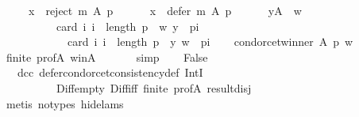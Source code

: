 \begin{isabellebody}
\ \ \ \ {}{\isacharcolon}{\kern0pt}\ {\isachardoublequoteopen}x\ {\isasymin}\ reject\ m\ A\ p{\isachardoublequoteclose}\ \isanewline
\ \ \ \ {}{\isacharcolon}{\kern0pt}\ {\isachardoublequoteopen}x\ {\isasymin}\ defer\ m\ A\ p{\isachardoublequoteclose}\ \isanewline
\ \ \ \ {}{\isacharcolon}{\kern0pt}\ {\isachardoublequoteopen}{\isasymforall}y{\isasymin}A\ {\isacharminus}{\kern0pt}\ {\isacharbraceleft}{\kern0pt}w{\isacharbraceright}{\kern0pt}{\isachardot}{\kern0pt}\isanewline
\ \ \ \ \ \ \ \ \ \ card\ {\isacharbraceleft}{\kern0pt}i{\isachardot}{\kern0pt}\ i\ {\isacharless}{\kern0pt}\ length\ p\ {\isasymand}\ {\isacharparenleft}{\kern0pt}w{\isacharcomma}{\kern0pt}\ y{\isacharparenright}{\kern0pt}\ {\isasymin}\ {\isacharparenleft}{\kern0pt}p{\isacharbang}{\kern0pt}i{\isacharparenright}{\kern0pt}{\isacharbraceright}{\kern0pt}\ {\isacharless}{\kern0pt}\isanewline
\ \ \ \ \ \ \ \ \ \ \ \ card\ {\isacharbraceleft}{\kern0pt}i{\isachardot}{\kern0pt}\ i\ {\isacharless}{\kern0pt}\ length\ p\ {\isasymand}\ {\isacharparenleft}{\kern0pt}y{\isacharcomma}{\kern0pt}\ w{\isacharparenright}{\kern0pt}\ {\isasymin}\ {\isacharparenleft}{\kern0pt}p{\isacharbang}{\kern0pt}i{\isacharparenright}{\kern0pt}{\isacharbraceright}{\kern0pt}{\isachardoublequoteclose}\isanewline
\ \ \isamarkupfalse%
\ {\isachardoublequoteopen}condorcet{\isacharunderscore}{\kern0pt}winner\ A\ p\ w{\isachardoublequoteclose}\isanewline
\ \ \ \ \isamarkupfalse%
\ finite\ prof{\isacharunderscore}{\kern0pt}A\ w{\isacharunderscore}{\kern0pt}in{\isacharunderscore}{\kern0pt}A\ {\isachardoublequoteopen}{}{\isachardoublequoteclose}\isanewline
\ \ \ \ \isamarkupfalse%
\ simp\isanewline
\ \ \isamarkupfalse%
\ {\isachardoublequoteopen}False{\isachardoublequoteclose}\isanewline
\ \ \ \ \isamarkupfalse%
\ {\isachardoublequoteopen}{}{\isachardoublequoteclose}\ {\isachardoublequoteopen}{}{\isachardoublequoteclose}\ dcc\ defer{\isacharunderscore}{\kern0pt}condorcet{\isacharunderscore}{\kern0pt}consistency{\isacharunderscore}{\kern0pt}def\ IntI\isanewline
\ \ \ \ \ \ \ \ \ \ Diff{\isacharunderscore}{\kern0pt}empty\ Diff{\isacharunderscore}{\kern0pt}iff\ finite\ prof{\isacharunderscore}{\kern0pt}A\ result{\isacharunderscore}{\kern0pt}disj\isanewline
\ \ \ \ \isamarkupfalse%
\ {\isacharparenleft}{\kern0pt}metis\ {\isacharparenleft}{\kern0pt}no{\isacharunderscore}{\kern0pt}types{\isacharcomma}{\kern0pt}\ hide{\isacharunderscore}{\kern0pt}lams{\isacharparenright}{\kern0pt}{\isacharparenright}{\kern0pt}\isanewline

\end{isabellebody}

